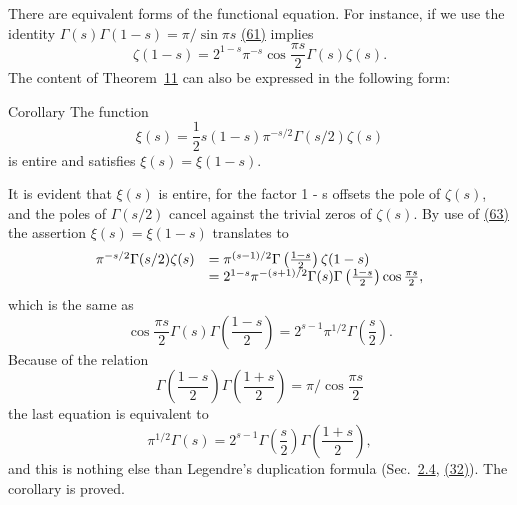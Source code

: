 There are equivalent forms of the functional equation. For instance, if we use the identity $\Gamma(s)\Gamma(1 - s) = \pi/\sin\pi s$ \hyperref[eq:5.61]{(61)} implies
\begin{equation*}
\zeta (1 - s) = 2 ^ {1 - s} \pi^ {- s} \cos \frac {\pi s}{2} \Gamma (s) \zeta (s).\tag{63}\label{eq:5.63}
\end{equation*}
The content of Theorem~\hyperref[thm:5.11]{11} can also be expressed in the following form:

\begin{originalstatement}{Corollary}{}\label{cor:5.unnumbered-p233-b4}
The function
\begin{equation*}
\xi (s) = \frac {1}{2} s (1 - s) \pi^ {- s / 2} \Gamma (s / 2) \zeta (s)
\end{equation*}
is entire and satisfies $\xi(s) = \xi(1 - s)$.

\end{originalstatement}
It is evident that $\xi(s)$ is entire, for the factor 1 - s offsets the pole of $\zeta(s)$, and the poles of $\Gamma(s/2)$ cancel against the trivial zeros of $\zeta(s)$. By use of \hyperref[eq:5.63]{(63)} the assertion $\xi(s) = \xi(1 - s)$ translates to
\begin{equation*}
\begin{array}{r l} \pi^ {- s / 2} \Gamma (s / 2) \zeta (s) & = \pi^ {(s - 1) / 2} \Gamma \left(\frac {1 - s}{2}\right) \zeta (1 - s) \\ & = 2 ^ {1 - s} \pi^ {- (s + 1) / 2} \Gamma (s) \Gamma \left(\frac {1 - s}{2}\right) \cos \frac {\pi s}{2}, \end{array}
\end{equation*}
which is the same as
\begin{equation*}
\cos \frac {\pi s}{2} \Gamma (s) \Gamma \left(\frac {1 - s}{2}\right) = 2 ^ {s - 1} \pi^ {1 / 2} \Gamma \left(\frac {s}{2}\right).
\end{equation*}
Because of the relation
\begin{equation*}
\Gamma \left(\frac {1 - s}{2}\right) \Gamma \left(\frac {1 + s}{2}\right) = \pi / \cos \frac {\pi s}{2}
\end{equation*}
the last equation is equivalent to
\begin{equation*}
\pi^ {1 / 2} \Gamma (s) = 2 ^ {s - 1} \Gamma \left(\frac {s}{2}\right) \Gamma \left(\frac {1 + s}{2}\right),
\end{equation*}
and this is nothing else than Legendre's duplication formula (Sec.~\hyperref[sec:5.2.4]{2.4}, \hyperref[eq:5.32]{(32)}). The corollary is proved.

